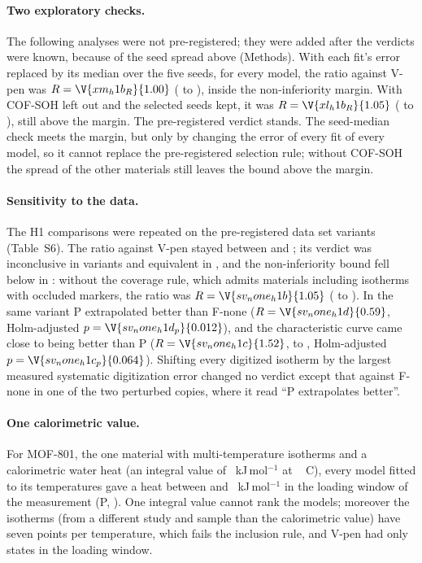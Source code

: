 \documentclass[journal=jcisd8,manuscript=article]{achemso}
\begin{document}
\paragraph{Two exploratory checks.} The following analyses were not pre-registered; they were added after the
verdicts were known, because of the seed spread above (Methods). With each fit's error
replaced by its median over the five seeds, for every model, the ratio against V-pen was
$R = \V{xm_h1b_R}{1.00}$ ( to ), inside the non-inferiority margin. With
COF-SOH left out and the selected seeds kept, it was $R = \V{xl_h1b_R}{1.05}$
( to ), still above the margin. The pre-registered verdict stands. The
seed-median check meets the margin, but only by changing the error of every fit of every model, so it cannot replace
the pre-registered selection rule; without COF-SOH the spread of the other materials still
leaves the bound above the margin.

\paragraph{Sensitivity to the data.} The H1 comparisons were repeated on the  pre-registered
data set variants (Table~S6). The ratio against V-pen stayed between  and
; its verdict was inconclusive in  variants and equivalent in
, and the non-inferiority bound fell below  in : without the
coverage rule, which admits  materials including isotherms with occluded markers, the ratio was
$R = \V{sv_none_h1b}{1.05}$ ( to ). In the same variant P
extrapolated better than F-none ($R = \V{sv_none_h1d}{0.59}$, Holm-adjusted $p = \V{sv_none_h1d_p}{0.012}$), and the
characteristic curve came close to being better than P ($R = \V{sv_none_h1c}{1.52}$,  to
, Holm-adjusted $p = \V{sv_none_h1c_p}{0.064}$). Shifting every digitized isotherm by the
largest measured systematic digitization error changed no verdict except that against F-none in one of the two
perturbed copies, where it read ``P extrapolates better''.

\paragraph{One calorimetric value.} For MOF-801, the one material with multi-temperature isotherms and a
calorimetric water heat (an integral value of ~kJ\,mol$^{-1}$ at ~\textdegree
C\cite{kim2016}), every model fitted to its  temperatures gave a heat between  and
~kJ\,mol$^{-1}$ in the loading window of the measurement (P, ). One integral value
cannot rank the models; moreover the isotherms (from a different study and sample than the calorimetric value\cite{kim2018}) have seven points per temperature, which fails the inclusion rule, and V-pen had only  states in the loading window.
\end{document}
